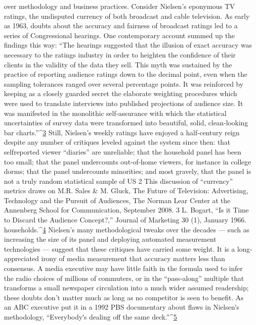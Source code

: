 over methodology and business practices.
Consider Nielsen’s eponymous TV ratings, the undisputed currency of
both broadcast and cable television. As early as 1963, doubts about the
accuracy and fairness of broadcast ratings led to a series of Congressional
hearings. One contemporary account summed up the findings this way:
``The hearings suggested that the illusion of exact accuracy was
necessary to the ratings industry in order to heighten the
confidence of their clients in the validity of the data they sell. This
myth was sustained by the practice of reporting audience ratings
down to the decimal point, even when the sampling tolerances
ranged over several percentage points. It was reinforced by keeping
as a closely guarded secret the elaborate weighting procedures
which were used to translate interviews into published projections
of audience size. It was manifested in the monolithic self‐assurance
with which the statistical uncertainties of survey data were
transformed into beautiful, solid, clean‐looking bar charts.''^{\href{#endnotes}{3}}
Still, Nielsen’s weekly ratings have enjoyed a half‐century reign despite
any number of critiques leveled against the system since then: that selfreported
viewer ``diaries'' are unreliable; that the household panel has
been too small; that the panel undercounts out‐of‐home viewers, for
instance in college dorms; that the panel undercounts minorities; and most
gravely, that the panel is not a truly random statistical sample of US
2 This discussion of ``currency'' metrics draws on M.R. Sales & M. Gluck, The Future
of Television: Advertising, Technology and the Pursuit of Audiences, The Norman
Lear Center at the Annenberg School for Communication, September 2008.
3 L. Bogart, ``Is it Time to Discard the Audience Concept?,'' Journal of Marketing 30
(1), January 1966.
households.^{\href{#endnotes}{4}} Nielsen’s many methodological tweaks over the decades —
such as increasing the size of its panel and deploying automated
measurement technologies — suggest that these critiques have carried
some weight.
It is a long‐appreciated irony of media measurement that accuracy matters
less than consensus. A media executive may have little faith in the
formula used to infer the radio choices of millions of commuters, or in the
``pass‐along'' multiple that transforms a small newspaper circulation into
a much wider assumed readership; these doubts don’t matter much as
long as no competitor is seen to benefit. As an ABC executive put it in a
1992 PBS documentary about flaws in Nielsenʹs methodology,
``Everybodyʹs dealing off the same deck.''^{\href{#endnotes}{5}}
